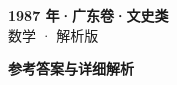 \documentclass[zihao=-4, a4paper]{ctexart}
\begin{document}
\begin{center}
  {\Large\bfseries 1987 年·广东卷·文史类}\\[4pt]
  {\large 数学 · 解析版}
\end{center}
\medskip
{}

\clearpage
{}
\begin{center}{\Large\bfseries 参考答案与详细解析}\end{center}
\medskip

\end{document}
